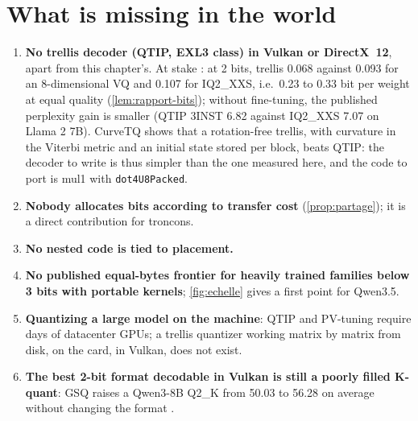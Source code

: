 \section{What is missing in the world}

\begin{enumerate}
\item \textbf{No trellis decoder (QTIP, EXL3 class) in Vulkan or DirectX~12}, apart from this chapter's. At stake \calc: at 2 bits, trellis 0.068 against 0.093 for an 8-dimensional VQ and 0.107 for IQ2\_XXS, i.e.\ 0.23 to 0.33 bit per weight at equal quality (\cref{lem:rapport-bits}); without fine-tuning, the published perplexity gain is smaller (QTIP 3INST 6.82 against IQ2\_XXS 7.07 on Llama 2 7B). CurveTQ shows that a rotation-free trellis, with curvature in the Viterbi metric and an initial state stored per block, beats QTIP: the decoder to write is thus simpler than the one measured here, and the code to port is mul1 with \texttt{dot4U8Packed}.
\item \textbf{Nobody allocates bits according to transfer cost} (\cref{prop:partage}); it is a direct contribution for troncons.
\item \textbf{No nested code is tied to placement.}
\item \textbf{No published equal-bytes frontier for heavily trained families below 3 bits with portable kernels}; \cref{fig:echelle} gives a first point for Qwen3.5.
\item \textbf{Quantizing a large model on the machine}: QTIP and PV-tuning require days of datacenter GPUs; a trellis quantizer working matrix by matrix from disk, on the card, in Vulkan, does not exist.
\item \textbf{The best 2-bit format decodable in Vulkan is still a poorly filled K-quant}: GSQ raises a Qwen3-8B Q2\_K from 50.03 to 56.28 on average without changing the format \litt.
\end{enumerate}

